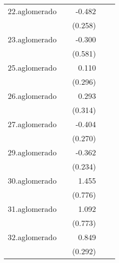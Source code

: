 {\begin{longtable}{l*{4}{D{.}{.}{-1}}}
\addlinespace
22.aglomerado&                     &      -0.482         &                     &                     \\
            &                     &     (0.258)         &                     &                     \\
\addlinespace
23.aglomerado&                     &      -0.300         &                     &                     \\
            &                     &     (0.581)         &                     &                     \\
\addlinespace
25.aglomerado&                     &       0.110         &                     &                     \\
            &                     &     (0.296)         &                     &                     \\
\addlinespace
26.aglomerado&                     &       0.293         &                     &                     \\
            &                     &     (0.314)         &                     &                     \\
\addlinespace
27.aglomerado&                     &      -0.404         &                     &                     \\
            &                     &     (0.270)         &                     &                     \\
\addlinespace
29.aglomerado&                     &      -0.362         &                     &                     \\
            &                     &     (0.234)         &                     &                     \\
\addlinespace
30.aglomerado&                     &       1.455         &                     &                     \\
            &                     &     (0.776)         &                     &                     \\
\addlinespace
31.aglomerado&                     &       1.092         &                     &                     \\
            &                     &     (0.773)         &                     &                     \\
\addlinespace
32.aglomerado&                     &       0.849\sym{**} &                     &                     \\
            &                     &     (0.292)         &                     &                     \\

\end{longtable}}
